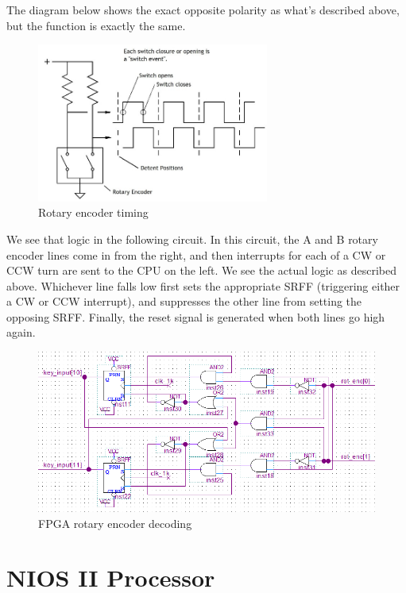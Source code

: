 The diagram below shows the exact opposite polarity as what's described above, but the function is exactly the same.

\begin{figure}[ht!]
    \centering
    \includegraphics[width=3in]{Timing/encoder.jpg}
		\caption{Rotary encoder timing}
\end{figure}

We see that logic in the following circuit. In this circuit, the A and B rotary encoder lines come in from the right, and then interrupts for each of a CW or CCW turn are sent to the CPU on the left. We see the actual logic as described above. Whichever line falls low first sets the appropriate SRFF (triggering either a CW or CCW interrupt), and suppresses the other line from setting the opposing SRFF. Finally, the reset signal is generated when both lines go high again.

\begin{figure}[ht!]
    \centering
    \includegraphics[width=6in]{fpga_logic/keys_rotary.png}
		\caption{FPGA rotary encoder decoding}
\end{figure}

\newpage
\section{NIOS II Processor}

